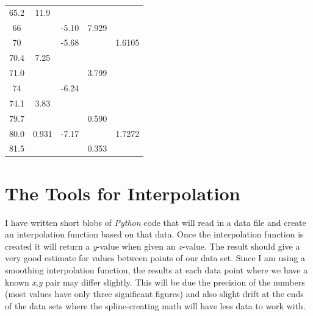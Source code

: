 \documentclass[]{tufte-handout}
\begin{document}
\begin{table}[h!]
\begin{tabular}{SSSSS}
        65.2              &  11.9                          &           {} &             {}     &             {}            \\
        66                 &                                   &  -5.10    &   7.929        &                         \\
        70                 &                                   &  -5.68    &                    &             1.6105      \\
        70.4              &   7.25                         &           {} &            {}      &              {}          \\
        71.0              &                                   &              &   3.799         &                         \\
       74                  &                                   &  -6.24    &                    &                         \\
       74.1               &   3.83                         &           {} &             {}    &             {}          \\
       79.7               &                                   &              &  0.590         &                         \\
       80.0               &   0.931                       &  -7.17    &            {}     &          1.7272         \\
       81.5               &                                   &              &  0.353         &                         \\

    \end{tabular}
\end{table}



\section{The Tools for Interpolation}

I have written short blobs of \textit{Python} code that will read in a data file and create an interpolation function based on that data. Once the interpolation function is created it will return a \textit{y}-value when given an \textit{x}-value. The result should give a very good estimate for values between points of our data set. Since I am using a smoothing interpolation function, the results at each data point where we have a known \textit{x},\textit{y} pair may differ slightly. This will be due the precision of the numbers (most values have only three significant figures) and also slight drift at the ends of the data sets where the spline-creating math will have less data to work with.
\end{document}
